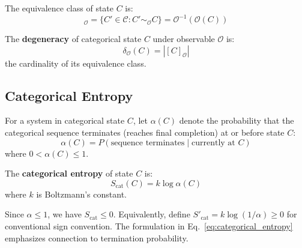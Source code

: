 \begin{definition}
The equivalence class of state $C$ is:
\begin{equation}
[C]_{\mathcal{O}} = \{C' \in \mathcal{C} : C' \sim_{\mathcal{O}} C\} = \mathcal{O}^{-1}(\mathcal{O}(C))
\end{equation}
\end{definition}

\begin{definition}[Degeneracy]
\label{def:degeneracy}
The \textbf{degeneracy} of categorical state $C$ under observable $\mathcal{O}$ is:
\begin{equation}
\delta_{\mathcal{O}}(C) = |[C]_{\mathcal{O}}|
\end{equation}
the cardinality of its equivalence class.
\end{definition}

\subsection{Categorical Entropy}

\begin{definition}
\label{def:completion_probability}
For a system in categorical state $C$, let $\alpha(C)$ denote the probability that the categorical sequence terminates (reaches final completion) at or before state $C$:
\begin{equation}
\alpha(C) = P(\text{sequence terminates} \mid \text{currently at } C)
\end{equation}
where $0 < \alpha(C) \leq 1$.
\end{definition}

\begin{definition}
\label{def:categorical_entropy}
The \textbf{categorical entropy} of state $C$ is:
\begin{equation}
S_{\text{cat}}(C) = k \log \alpha(C)
\label{eq:categorical_entropy}
\end{equation}
where $k$ is Boltzmann's constant.
\end{definition}

\begin{remark}
Since $\alpha \leq 1$, we have $S_{\text{cat}} \leq 0$. Equivalently, define $S'_{\text{cat}} = k \log(1/\alpha) \geq 0$ for conventional sign convention. The formulation in Eq.~\eqref{eq:categorical_entropy} emphasizes connection to termination probability.
\end{remark}

